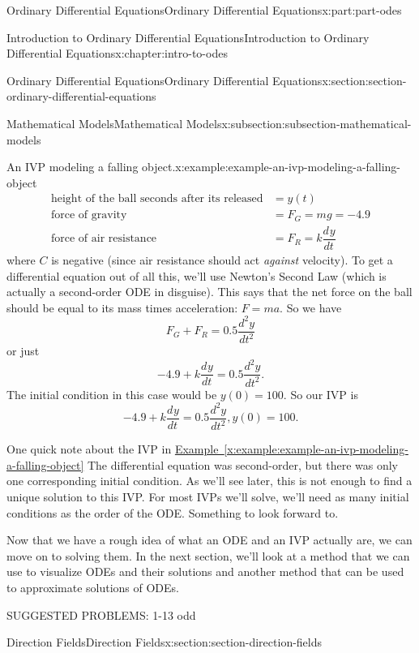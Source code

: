\documentclass[twoside,10pt,]{book}
\newcommand{\xreffont}{\relax}
\numberwithin{equation}{part}
\providecommand{\dv}[3][]{\dfrac{d^{#1} #2}{d #3^{#1}}}
\begin{document}
\begin{partptx}{Ordinary Differential Equations}{}{Ordinary Differential Equations}{}{}{x:part:part-odes}
\begin{chapterptx}{Introduction to Ordinary Differential Equations}{}{Introduction to Ordinary Differential Equations}{}{}{x:chapter:intro-to-odes}
\begin{sectionptx}{Ordinary Differential Equations}{}{Ordinary Differential Equations}{}{}{x:section:section-ordinary-differential-equations}
\begin{subsectionptx}{Mathematical Models}{}{Mathematical Models}{}{}{x:subsection:subsection-mathematical-models}
\begin{example}{An IVP modeling a falling object.}{x:example:example-an-ivp-modeling-a-falling-object}
\begin{align*}
\text{height of the ball  seconds after its released} &= y(t) \\
\text{force of gravity} &= F_{G} = mg = -4.9\\
\text{force of air resistance} &= F_{R} = k\dv{y}{t} 
\end{align*}
where \(C\) is negative (since air resistance should act \emph{against} velocity). To get a differential equation out of all this, we'll use Newton's Second Law (which is actually a second-order ODE in disguise). This says that the net force on the ball should be equal to its mass times acceleration: \(F = ma\). So we have%
\begin{equation*}
F_{G}+F_{R} = 0.5\dv[2]{y}{t}
\end{equation*}
or just%
\begin{equation*}
-4.9+k\dv{y}{t} = 0.5\dv[2]{y}{t}.
\end{equation*}
The initial condition in this case would be \(y(0) = 100\). So our IVP is%
\begin{equation*}
-4.9+k\dv{y}{t} = 0.5\dv[2]{y}{t}, y(0) = 100.
\end{equation*}
%
\end{example}
One quick note about the IVP in \hyperref[x:example:example-an-ivp-modeling-a-falling-object]{Example~{\xreffont\ref{x:example:example-an-ivp-modeling-a-falling-object}}} The differential equation was second-order, but there was only one corresponding initial condition. As we'll see later, this is not enough to find a unique solution to this IVP. For most IVPs we'll solve, we'll need as many initial conditions as the order of the ODE. Something to look forward to.%
\end{subsectionptx}
\begin{conclusion}{}%
Now that we have a rough idea of what an ODE and an IVP actually are, we can move on to solving them. In the next section, we'll look at a method that we can use to visualize ODEs and their solutions and another method that can be used to approximate solutions of ODEs.%
\par
SUGGESTED PROBLEMS: 1-13 odd%
\end{conclusion}%
\end{sectionptx}
%
%
\typeout{************************************************}
\typeout{************************************************}
%
\begin{sectionptx}{Direction Fields}{}{Direction Fields}{}{}{x:section:section-direction-fields}
\begin{introduction}{}%

\end{introduction}
\end{sectionptx}
\end{chapterptx}
\end{partptx}
\end{document}
